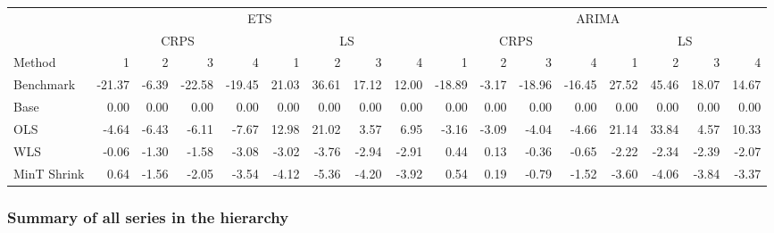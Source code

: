 \documentclass[]{article}
\begin{document}
\begin{table}[H]
\centering
\begin{tabular}{l|r|r|r|r|r|r|r|r|r|r|r|r|r|r|r|r}
\hline
\multicolumn{1}{c|}{ } & \multicolumn{8}{|c|}{ETS} & \multicolumn{8}{|c}{ARIMA} \\
\cline{2-9} \cline{10-17}
\multicolumn{1}{c|}{ } & \multicolumn{4}{|c|}{CRPS} & \multicolumn{4}{|c|}{LS} & \multicolumn{4}{|c|}{CRPS} & \multicolumn{4}{|c}{LS} \\
\cline{2-5} \cline{6-9} \cline{10-13} \cline{14-17}
Method & 1 & 2 & 3 & 4 & 1 & 2 & 3 & 4 & 1 & 2 & 3 & 4 & 1 & 2 & 3 & 4\\
\hline
Benchmark & -21.37 & -6.39 & -22.58 & -19.45 & 21.03 & 36.61 & 17.12 & 12.00 & -18.89 & -3.17 & -18.96 & -16.45 & 27.52 & 45.46 & 18.07 & 14.67\\
\hline
Base & 0.00 & 0.00 & 0.00 & 0.00 & 0.00 & 0.00 & 0.00 & 0.00 & 0.00 & 0.00 & 0.00 & 0.00 & 0.00 & 0.00 & 0.00 & 0.00\\
\hline
OLS & -4.64 & -6.43 & -6.11 & -7.67 & 12.98 & 21.02 & 3.57 & 6.95 & -3.16 & -3.09 & -4.04 & -4.66 & 21.14 & 33.84 & 4.57 & 10.33\\
\hline
WLS & -0.06 & -1.30 & -1.58 & -3.08 & -3.02 & -3.76 & -2.94 & -2.91 & 0.44 & 0.13 & -0.36 & -0.65 & -2.22 & -2.34 & -2.39 & -2.07\\
\hline
MinT Shrink & 0.64 & -1.56 & -2.05 & -3.54 & -4.12 & -5.36 & -4.20 & -3.92 & 0.54 & 0.19 & -0.79 & -1.52 & -3.60 & -4.06 & -3.84 & -3.37\\
\hline
\end{tabular}
\end{table}

\subsubsection{Summary of all series in the
hierarchy}\label{summary-of-all-series-in-the-hierarchy-2}
\end{document}
